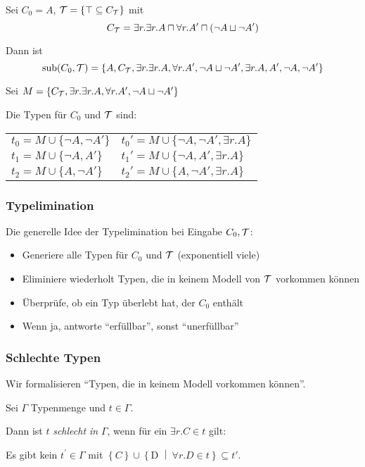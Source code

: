 \begin{tafel}\label{t:synTyp}
Sei $C_0 = A$, $\mathcal{T} = \{\top \subseteq C_{\mathcal{T}}\}$ mit $$C_{\mathcal{T}} = \exists r.\exists r.A \sqcap \forall r.A' \sqcap (\neg A \sqcup \neg A')$$

Dann ist $$\operatorname{sub}(C_0, \mathcal{T}) = \{A, C_{\mathcal{T}}, \exists r.\exists r.A, \forall r.A',\neg A \sqcup \neg A', \exists r.A, A', \neg A, \neg A'\}$$

Sei $M = \{C_{\mathcal{T}}, \exists r.\exists r. A, \forall r.A', \neg A \sqcup \neg A'\}$

Die Typen für $C_0$ und $\mathcal{T}$ sind:

\begin{tabular}{ll}
    $t_0 = M \cup \{\neg A, \neg A'\}$ &  $t_0' = M \cup \{ \neg A, \neg A', \exists r.A\}$\\
    $t_1 = M \cup \{\neg A, A'\}$ & $t_1' = M \cup \{\neg A, A', \exists r.A\}$ \\
    $t_2 = M \cup \{A, \neg A'\}$ & $t_2' = M \cup \{A, \neg A', \exists r.A\}$\\
\end{tabular}
\end{tafel}

\subsubsection{Typelimination}\label{typelimination}

Die generelle Idee der Typelimination bei Eingabe $C_0, \mathcal{T}$:
\begin{itemize}
\item
  Generiere alle Typen für $C_{0}$ und $\mathcal{T}$ (exponentiell viele)
\item
  Eliminiere wiederholt Typen, die in keinem Modell von $\mathcal{T}$ vorkommen
  können
\item
  Überprüfe, ob ein Typ überlebt hat, der $C_{0}$ enthält
\item
    Wenn ja, antworte \enquote{erfüllbar}, sonst \enquote{unerfüllbar}
\end{itemize}

\subsubsection{Schlechte Typen}\label{schlechter-typ}

Wir formalisieren \enquote{Typen, die in keinem Modell vorkommen können}.

\begin{definition}\label{def-badtype}

Sei $\Gamma$ Typenmenge und $t \in \Gamma$.

Dann ist $t$ \emph{schlecht in} $\Gamma$, wenn für ein $\exists r.C \in t$ gilt:

\begin{center}Es gibt kein $t^{'} \in \Gamma$ mit
$\left\{ C \right\} \cup \left\{ \text{D\ } \middle| \ \forall r.D \in t \right\} \subseteq t'$.\end{center}
\end{definition}

